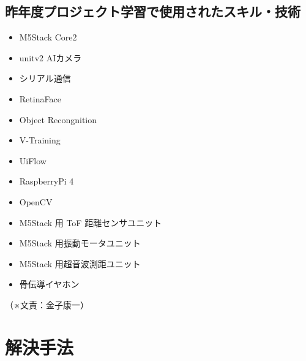 \documentclass[12pt,a4paper]{report}
\newcommand{\Writer}[1]{
  \normalsize
  \begin{flushright}
    （※文責：#1）
  \end{flushright}
}
\begin{document}
\subsection{昨年度プロジェクト学習で使用されたスキル・技術}
\noindent\space
\begin{itemize}
  \item M5Stack Core2
  \item unitv2 AIカメラ
  \item シリアル通信
  \item RetinaFace
  \item Object Recongnition
  \item V-Training
  \item UiFlow
  \item RaspberryPi 4
  \item OpenCV
  \item M5Stack 用 ToF 距離センサユニット
  \item M5Stack 用振動モータユニット
  \item M5Stack 用超音波測距ユニット
  \item 骨伝導イヤホン
\end{itemize}
\Writer{金子康一}

\newpage

\section{解決手法}
\end{document}

